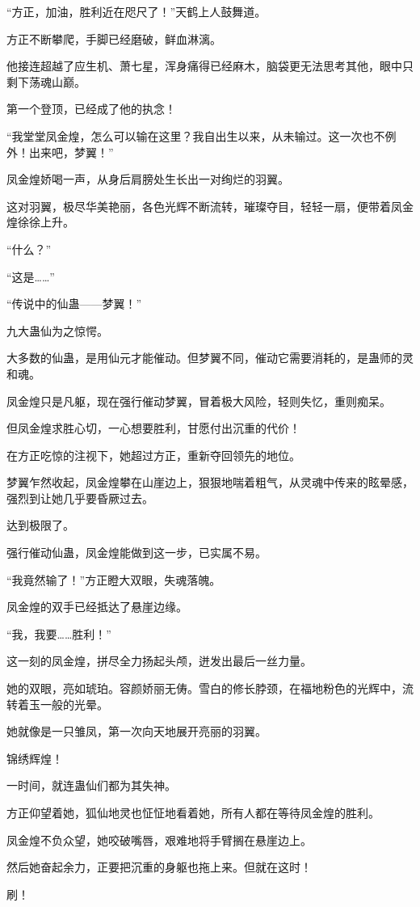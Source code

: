 \begin{this_body}
“方正，加油，胜利近在咫尺了！”天鹤上人鼓舞道。

方正不断攀爬，手脚已经磨破，鲜血淋漓。

他接连超越了应生机、萧七星，浑身痛得已经麻木，脑袋更无法思考其他，眼中只剩下荡魂山巅。

第一个登顶，已经成了他的执念！

“我堂堂凤金煌，怎么可以输在这里？我自出生以来，从未输过。这一次也不例外！出来吧，梦翼！”

凤金煌娇喝一声，从身后肩膀处生长出一对绚烂的羽翼。

这对羽翼，极尽华美艳丽，各色光辉不断流转，璀璨夺目，轻轻一扇，便带着凤金煌徐徐上升。

“什么？”

“这是……”

“传说中的仙蛊——梦翼！”

九大蛊仙为之惊愕。

大多数的仙蛊，是用仙元才能催动。但梦翼不同，催动它需要消耗的，是蛊师的灵和魂。

凤金煌只是凡躯，现在强行催动梦翼，冒着极大风险，轻则失忆，重则痴呆。

但凤金煌求胜心切，一心想要胜利，甘愿付出沉重的代价！

在方正吃惊的注视下，她超过方正，重新夺回领先的地位。

梦翼乍然收起，凤金煌攀在山崖边上，狠狠地喘着粗气，从灵魂中传来的眩晕感，强烈到让她几乎要昏厥过去。

达到极限了。

强行催动仙蛊，凤金煌能做到这一步，已实属不易。

“我竟然输了！”方正瞪大双眼，失魂落魄。

凤金煌的双手已经抵达了悬崖边缘。

“我，我要……胜利！”

这一刻的凤金煌，拼尽全力扬起头颅，迸发出最后一丝力量。

她的双眼，亮如琥珀。容颜娇丽无俦。雪白的修长脖颈，在福地粉色的光辉中，流转着玉一般的光晕。

她就像是一只雏凤，第一次向天地展开亮丽的羽翼。

锦绣辉煌！

一时间，就连蛊仙们都为其失神。

方正仰望着她，狐仙地灵也怔怔地看着她，所有人都在等待凤金煌的胜利。

凤金煌不负众望，她咬破嘴唇，艰难地将手臂搁在悬崖边上。

然后她奋起余力，正要把沉重的身躯也拖上来。但就在这时！

刷！


\end{this_body}
